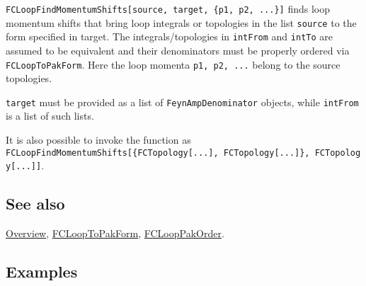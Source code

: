 \documentclass[../FeynCalcManual.tex]{subfiles}
\begin{document}
\texttt{FCLoopFindMomentumShifts[\allowbreak{}source,\ \allowbreak{}target,\ \allowbreak{}\{\allowbreak{}p1,\ \allowbreak{}p2,\ \allowbreak{}...\}]}
finds loop momentum shifts that bring loop integrals or topologies in
the list \texttt{source} to the form specified in target. The
integrals/topologies in \texttt{intFrom} and \texttt{intTo} are assumed
to be equivalent and their denominators must be properly ordered via
\texttt{FCLoopToPakForm}. Here the loop momenta
\texttt{p1,\ \allowbreak{}p2,\ \allowbreak{}...} belong to the source
topologies.

\texttt{target} must be provided as a list of
\texttt{FeynAmpDenominator} objects, while \texttt{intFrom} is a list of
such lists.

It is also possible to invoke the function as
\texttt{FCLoopFindMomentumShifts[\allowbreak{}\{\allowbreak{}FCTopology[\allowbreak{}...],\ \allowbreak{}FCTopology[\allowbreak{}...]\},\ \allowbreak{}FCTopology[\allowbreak{}...]]}.

\subsection{See also}

\hyperlink{toc}{Overview}, \hyperlink{fclooptopakform}{FCLoopToPakForm},
\hyperlink{fclooppakorder}{FCLoopPakOrder}.

\subsection{Examples}

\begin{Shaded}
\begin{Highlighting}[]
\ExtensionTok{=} \OperatorTok{\{\{}\OperatorTok{[}\OperatorTok{],}\OperatorTok{[}\OperatorTok{],}\OperatorTok{[}\SpecialCharTok{{-}}\SpecialCharTok{{-}}\OperatorTok{],} 
\OperatorTok{[\{}\SpecialCharTok{{-}}\OperatorTok{,}\OperatorTok{\}],}\OperatorTok{[\{}\OperatorTok{,}\OperatorTok{\}],}\OperatorTok{[}\SpecialCharTok{+}\OperatorTok{],} 
\OperatorTok{[}\SpecialCharTok{+}\OperatorTok{]\}\}}
\end{Highlighting}
\end{Shaded}
\end{document}
